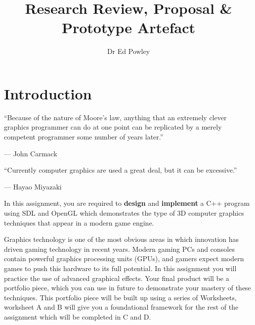 \documentclass{../fal_assignment}
\title{Research Review, Proposal \& Prototype Artefact}
\author{Dr Ed Powley}
\begin{document}
\maketitle

\section*{Introduction}

\begin{marginquote}
``Because of the nature of Moore's law, anything that an extremely clever graphics programmer can do at one point can be replicated by a merely competent programmer some number of years later.''

--- John Carmack

    \marginquoterule

``Currently computer graphics are used a great deal, but it can be excessive.''

--- Hayao Miyazaki
\end{marginquote}

In this assignment, you are required to \textbf{design} and \textbf{implement} a C++ program using SDL and OpenGL
which demonstrates the type of 3D computer graphics techniques that appear in a modern game engine.

Graphics technology is one of the most obvious areas in which innovation has driven gaming technology in recent years.
Modern gaming PCs and consoles contain powerful graphics processing units (GPUs),
and gamers expect modern games to push this hardware to its full potential.
In this assignment you will practice the use of advanced graphical effects.
Your final product will be a portfolio piece, which you can use in future to demonstrate your mastery of these techniques. This portfolio piece will be built up using a series of Worksheets, worksheet A and B will give you a foundational framework for
the rest of the assignment which will be completed in C and D.
\end{document}
